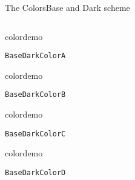 \begin{frame}{The Colors}{Base and Dark scheme}
\begin{columns}
\begin{column}{0.45\textwidth}
\begin{beamercolorbox}[dp=0pt,sep=0em,wd=\bwidth,ht=10cm]{}
%
\begin{beamercolorbox}[sep=0em,wd=2cm,ht=2cm]{colordemo}
\end{beamercolorbox}\quad\texttt{BaseDarkColorA}\hfill\newline%
%
\begin{beamercolorbox}[sep=0em,wd=2cm,ht=2cm]{colordemo}%
\end{beamercolorbox}\quad\texttt{BaseDarkColorB}\hfill\newline%
%
\begin{beamercolorbox}[sep=0em,wd=2cm,ht=2cm]{colordemo}%
\end{beamercolorbox}\quad\texttt{BaseDarkColorC}\hfill\newline%
%
\begin{beamercolorbox}[sep=0em,wd=2cm,ht=2cm]{colordemo}%
\end{beamercolorbox}\quad\texttt{BaseDarkColorD}%
\end{beamercolorbox}%
\end{column}
\end{columns}
\end{frame}
%
%
%
%
%
